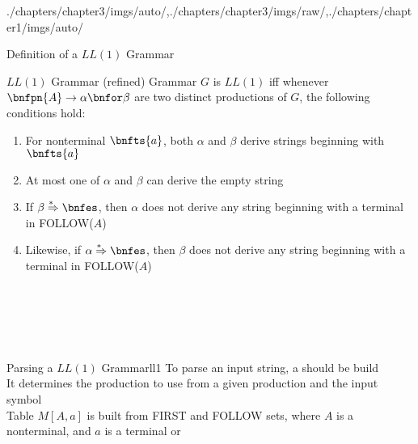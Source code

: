 \begin{graphicspathcontext}{{./chapters/chapter3/imgs/auto/},{./chapters/chapter3/imgs/raw/},{./chapters/chapter1/imgs/auto/}}
\begin{bibunit}[apalike]
\begin{frame}[t]{Definition of a $LL(1)$ Grammar}
	\begin{small}
		\begin{definitionblock}{$LL(1)$ Grammar (refined)}
			Grammar $G$ is $LL(1)$ iff whenever $\bnfpn{A} \bnfopo \alpha \bnfor \beta$ are two distinct productions of $G$, the following conditions hold:
				\begin{enumerate}
				\item For nonterminal $\bnfts{a}$, both $\alpha$ and $\beta$ derive strings beginning with $\bnfts{a}$
				\item At most one of $\alpha$ and $\beta$ can derive the empty string
				\item If $\beta\seqderiv\bnfes$, then $\alpha$ does not derive any string beginning with a terminal in FOLLOW($A$)
				\item Likewise, if $\alpha\seqderiv\bnfes$, then $\beta$ does not derive any string beginning with a terminal in FOLLOW($A$)
				\end{enumerate}
		\end{definitionblock}
		\vspace{-.6cm}
		\begin{bnf}
			 \\
			\bnfalt*{\bnfes} \\
			 \\
			 \\
		\end{bnf}
	\end{small}
\end{frame}

\begin{leftlawnframe}{Parsing a $LL(1)$ Grammar}{ll1}
		To parse an input string, a  should be build \\[.2cm]
		It determines the production to use from a given production and the input symbol \\[.2cm]
		Table $M[A,a]$ is built from FIRST and FOLLOW sets, where $A$ is a nonterminal, and $a$ is a terminal or 
\end{leftlawnframe}


\end{bibunit}
\end{graphicspathcontext}
